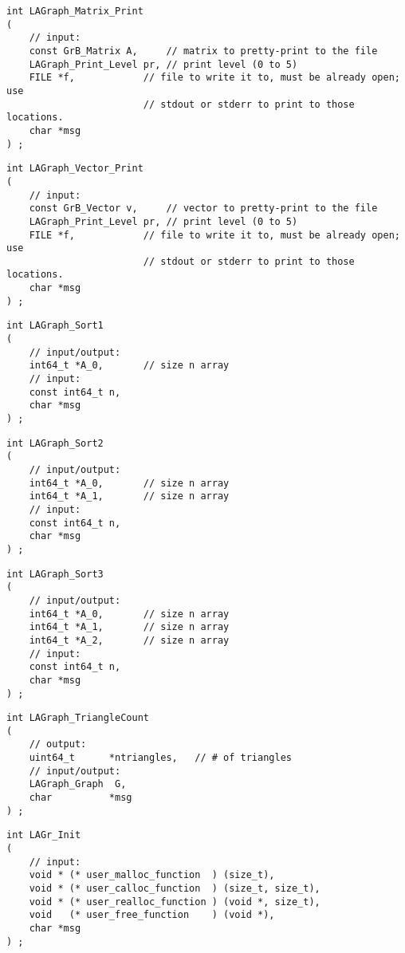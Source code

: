 \begin{verbatim}
int LAGraph_Matrix_Print
(
    // input:
    const GrB_Matrix A,     // matrix to pretty-print to the file
    LAGraph_Print_Level pr, // print level (0 to 5)
    FILE *f,            // file to write it to, must be already open; use
                        // stdout or stderr to print to those locations.
    char *msg
) ;
\end{verbatim}




\begin{verbatim}
int LAGraph_Vector_Print
(
    // input:
    const GrB_Vector v,     // vector to pretty-print to the file
    LAGraph_Print_Level pr, // print level (0 to 5)
    FILE *f,            // file to write it to, must be already open; use
                        // stdout or stderr to print to those locations.
    char *msg
) ;
\end{verbatim}




\begin{verbatim}
int LAGraph_Sort1
(
    // input/output:
    int64_t *A_0,       // size n array
    // input:
    const int64_t n,
    char *msg
) ;
\end{verbatim}




\begin{verbatim}
int LAGraph_Sort2
(
    // input/output:
    int64_t *A_0,       // size n array
    int64_t *A_1,       // size n array
    // input:
    const int64_t n,
    char *msg
) ;
\end{verbatim}




\begin{verbatim}
int LAGraph_Sort3
(
    // input/output:
    int64_t *A_0,       // size n array
    int64_t *A_1,       // size n array
    int64_t *A_2,       // size n array
    // input:
    const int64_t n,
    char *msg
) ;
\end{verbatim}




\begin{verbatim}
int LAGraph_TriangleCount
(
    // output:
    uint64_t      *ntriangles,   // # of triangles
    // input/output:
    LAGraph_Graph  G,
    char          *msg
) ;
\end{verbatim}




\begin{verbatim}
int LAGr_Init
(
    // input:
    void * (* user_malloc_function  ) (size_t),
    void * (* user_calloc_function  ) (size_t, size_t),
    void * (* user_realloc_function ) (void *, size_t),
    void   (* user_free_function    ) (void *),
    char *msg
) ;
\end{verbatim}




